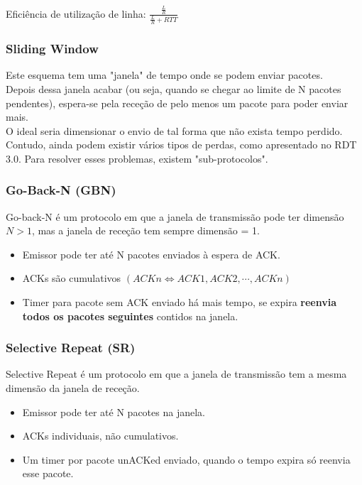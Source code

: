 \documentclass[12pt]{article}
\begin{document}
Eficiência de utilização de linha: 
$\displaystyle \frac{\frac{L}{R}}{\frac{L}{R}+RTT}$

\subsubsection{Sliding Window}

Este esquema tem uma "janela" de tempo onde se podem enviar pacotes.\\
Depois dessa janela acabar (ou seja, quando se chegar ao limite de N pacotes pendentes), espera-se pela receção de pelo menos um pacote para poder enviar mais.\\
O ideal seria dimensionar o envio de tal forma que não exista tempo perdido.\\
Contudo, ainda podem existir vários tipos de perdas, como apresentado no RDT 3.0.
Para resolver esses problemas, existem "sub-protocolos".

\subsubsection*{Go-Back-N (GBN)}

Go-back-N é um protocolo em que a janela de transmissão pode ter dimensão $N>1$, mas a janela de receção tem sempre dimensão = 1.

\begin{itemize}
    \item Emissor pode ter até N pacotes enviados à espera de ACK.
    \item ACKs são cumulativos $\left(ACKn \Leftrightarrow  ACK1, ACK2, \cdots, ACKn\right)$
    \item Timer para pacote sem ACK enviado há mais tempo, se expira \textbf{reenvia todos os pacotes seguintes} contidos na janela.
\end{itemize}

\subsubsection*{Selective Repeat (SR)}

Selective Repeat é um protocolo em que a janela de transmissão tem a mesma dimensão da janela de receção.

\begin{itemize}
    \item Emissor pode ter até N pacotes na janela.
    \item ACKs individuais, não cumulativos.
    \item Um timer por pacote unACKed enviado, quando o tempo expira só reenvia esse pacote.
\end{itemize}
\end{document}

